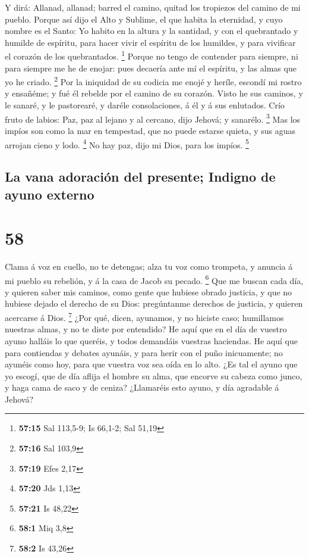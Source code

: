  Y dirá: Allanad, allanad; barred el camino, quitad los
tropiezos del camino de mi pueblo.  Porque así dijo el Alto
y Sublime, el que habita la eternidad, y cuyo nombre es el Santo: Yo
habito en la altura y la santidad, y con el quebrantado y humilde de
espíritu, para hacer vivir el espíritu de los humildes, y para vivificar
el corazón de los quebrantados. \footnote{\textbf{57:15} Sal 113,5-9; Is
  66,1-2; Sal 51,19}  Porque no tengo de contender para
siempre, ni para siempre me he de enojar: pues decaería ante mí el
espíritu, y las almas que yo he criado. \footnote{\textbf{57:16} Sal
  103,9}  Por la iniquidad de su codicia me enojé y heríle,
escondí mi rostro y ensañéme; y fué él rebelde por el camino de su
corazón.  Visto he sus caminos, y le sanaré, y le
pastorearé, y daréle consolaciones, á él y á sus enlutados.
 Crío fruto de labios: Paz, paz al lejano y al cercano,
dijo Jehová; y sanarélo. \footnote{\textbf{57:19} Efes 2,17}
 Mas los impíos son como la mar en tempestad, que no puede
estarse quieta, y sus aguas arrojan cieno y lodo. \footnote{\textbf{57:20}
  Jds 1,13}  No hay paz, dijo mi Dios, para los impíos.
\footnote{\textbf{57:21} Is 48,22}

\hypertarget{la-vana-adoraciuxf3n-del-presente-indigno-de-ayuno-externo}{%
\subsection{La vana adoración del presente; Indigno de ayuno
externo}\label{la-vana-adoraciuxf3n-del-presente-indigno-de-ayuno-externo}}

\hypertarget{section-57}{%
\section{58}\label{section-57}}

 Clama á voz en cuello, no te detengas; alza tu voz como
trompeta, y anuncia á mi pueblo su rebelión, y á la casa de Jacob su
pecado. \footnote{\textbf{58:1} Miq 3,8}  Que me buscan cada
día, y quieren saber mis caminos, como gente que hubiese obrado
justicia, y que no hubiese dejado el derecho de su Dios: pregúntanme
derechos de justicia, y quieren acercarse á Dios. \footnote{\textbf{58:2}
  Is 43,26}  ¿Por qué, dicen, ayunamos, y no hiciste caso;
humillamos nuestras almas, y no te diste por entendido? He aquí que en
el día de vuestro ayuno halláis lo que queréis, y todos demandáis
vuestras haciendas.  He aquí que para contiendas y debates
ayunáis, y para herir con el puño inicuamente; no ayunéis como hoy, para
que vuestra voz sea oída en lo alto.  ¿Es tal el ayuno que
yo escogí, que de día aflija el hombre su alma, que encorve su cabeza
como junco, y haga cama de saco y de ceniza? ¿Llamaréis esto ayuno, y
día agradable á Jehová?

